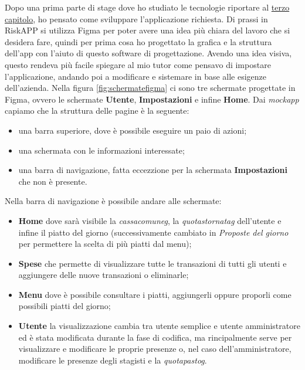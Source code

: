 Dopo una prima parte di stage dove ho studiato le tecnologie riportare al \hyperref[sec:tecnologie]{terzo capitolo}, ho pensato come sviluppare l'applicazione richiesta.\newline
Di prassi in RiskAPP si utilizza Figma per poter avere una idea più chiara del lavoro che si desidera fare, quindi per prima cosa ho progettato la grafica e la struttura dell'app con l'aiuto di questo software di progettazione.\newline
Avendo una idea visiva, questo rendeva più facile spiegare al mio tutor come pensavo di impostare l'applicazione, andando poi a modificare e sistemare in base alle esigenze dell'azienda.\newline
\newline
Nella figura \ref{fig:schermatefigma} ci sono tre schermate progettate in Figma, ovvero le schermate \textbf{Utente}, \textbf{Impostazioni} e infine \textbf{Home}.\newline
Dai \emph{mockapp} capiamo che la struttura delle pagine è la seguente:
\begin{itemize}
    \item una barra superiore, dove è possibile eseguire un paio di azioni;
    \item una schermata con le informazioni interessate;
    \item una barra di navigazione, fatta eccezzione per la schermata \textbf{Impostazioni} che non è presente.
\end{itemize}
Nella barra di navigazione è possibile andare alle schermate:
\begin{itemize}
    \item \textbf{Home} dove sarà visibile la \emph{\gls{cassacomuneg}}, la \emph{\gls{quotastornatag}} dell'utente e infine il piatto del giorno (successivamente cambiato in \emph{Proposte del giorno} per permettere la scelta di più piatti dal menu);
    \item \textbf{Spese} che permette di visualizzare tutte le transazioni di tutti gli utenti e aggiungere delle nuove transazioni o eliminarle;
    \item \textbf{Menu} dove è possibile consultare i piatti, aggiungerli oppure proporli come possibili piatti del giorno;
    \item \textbf{Utente} la visualizzazione cambia tra utente semplice e utente amministratore ed è stata modificata durante la fase di codifica, ma rincipalmente serve per visualizzare e modificare le proprie presenze o, nel caso dell'amministratore, modificare le presenze degli stagisti e la \emph{\gls{quotapastog}}.
\end{itemize}
